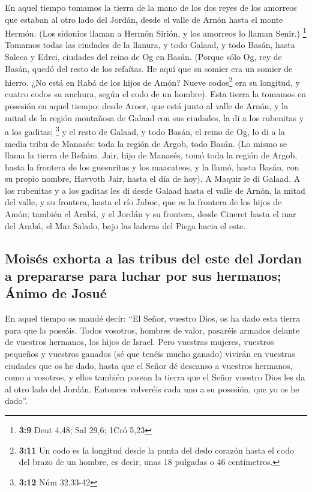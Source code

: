 \begin{paracol}{2}
 En aquel tiempo tomamos la tierra de la mano de los dos
reyes de los amorreos que estaban al otro lado del Jordán, desde el
valle de Arnón hasta el monte Hermón.  (Los sidonios
llaman a Hermón Sirión, y los amorreos lo llaman Senir.) \footnote{\textbf{3:9}
  Deut 4,48; Sal 29,6; 1Cró 5,23}  Tomamos todas las
ciudades de la llanura, y todo Galaad, y todo Basán, hasta Saleca y
Edrei, ciudades del reino de Og en Basán.  (Porque sólo
Og, rey de Basán, quedó del resto de los refaítas. He aquí que su somier
era un somier de hierro. ¿No está en Rabá de los hijos de Amón? Nueve
codos\footnote{\textbf{3:11} Un codo es la longitud desde la punta del
  dedo corazón hasta el codo del brazo de un hombre, es decir, unas 18
  pulgadas o 46 centímetros.} era su longitud, y cuatro codos su
anchura, según el codo de un hombre).  Esta tierra la
tomamos en posesión en aquel tiempo: desde Aroer, que está junto al
valle de Arnón, y la mitad de la región montañosa de Galaad con sus
ciudades, la di a los rubenitas y a los gaditas; \footnote{\textbf{3:12}
  Núm 32,33-42}  y el resto de Galaad, y todo Basán, el
reino de Og, lo di a la media tribu de Manasés: toda la región de Argob,
todo Basán. (Lo mismo se llama la tierra de Refaim. 
Jair, hijo de Manasés, tomó toda la región de Argob, hasta la frontera
de los guesuritas y los maacateos, y la llamó, hasta Basán, con su
propio nombre, Havvoth Jair, hasta el día de hoy).  A
Maquir le di Galaad.  A los rubenitas y a los gaditas les
di desde Galaad hasta el valle de Arnón, la mitad del valle, y su
frontera, hasta el río Jaboc, que es la frontera de los hijos de Amón;
 también el Arabá, y el Jordán y su frontera, desde
Cineret hasta el mar del Arabá, el Mar Salado, bajo las laderas del
Pisga hacia el este.

\hypertarget{moisuxe9s-exhorta-a-las-tribus-del-este-del-jordan-a-prepararse-para-luchar-por-sus-hermanos-uxe1nimo-de-josuuxe9}{%
\subsection{Moisés exhorta a las tribus del este del Jordan a prepararse
para luchar por sus hermanos; Ánimo de
Josué}\label{moisuxe9s-exhorta-a-las-tribus-del-este-del-jordan-a-prepararse-para-luchar-por-sus-hermanos-uxe1nimo-de-josuuxe9}}

 En aquel tiempo os mandé decir: ``El Señor, vuestro
Dios, os ha dado esta tierra para que la poseáis. Todos vosotros,
hombres de valor, pasaréis armados delante de vuestros hermanos, los
hijos de Israel.  Pero vuestras mujeres, vuestros
pequeños y vuestros ganados (sé que tenéis mucho ganado) vivirán en
vuestras ciudades que os he dado,  hasta que el Señor dé
descanso a vuestros hermanos, como a vosotros, y ellos también posean la
tierra que el Señor vuestro Dios les da al otro lado del Jordán.
Entonces volveréis cada uno a su posesión, que yo os he dado''.


\end{paracol}
